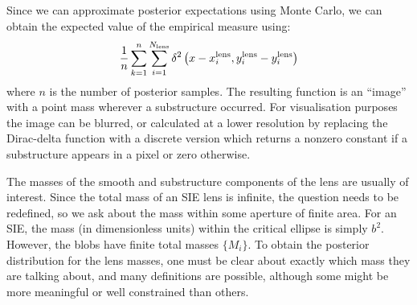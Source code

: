\documentclass[useAMS,usenatbib]{mn2e}
\begin{document}
Since we can approximate posterior expectations using Monte Carlo, we can
obtain the expected value of the empirical measure using:
\begin{eqnarray}
\frac{1}{n}
\sum_{k=1}^n
\sum_{i=1}^{N_{\rm lens}}
\delta^2\left(x - x_i^{\rm lens}, y_i^{\rm lens} - y_i^{\rm lens}\right)
\end{eqnarray}
where $n$ is the number of posterior samples. The resulting function is
an ``image'' with a point mass wherever a substructure occurred. For
visualisation purposes the image can be blurred, or calculated at a lower
resolution by replacing the Dirac-delta function with a discrete version
which returns a nonzero constant
if a substructure appears in a pixel or zero otherwise.

The masses of the smooth and substructure components of the lens are usually
of interest. Since the total mass of an SIE lens is infinite, the question
needs to be redefined, so we ask about the mass within some aperture of finite
area. For an SIE, the mass (in dimensionless units) within the critical
ellipse is simply $b^2$. However, the blobs have finite total masses
$\{M_i\}$. To obtain the posterior distribution for the lens masses, one must
be clear about exactly which mass they are talking about, and many definitions
are possible, although some might be more meaningful or well constrained than
others.
\end{document}
